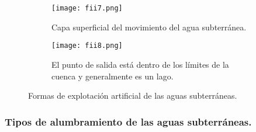 \begin{figure}[h!]
	\centering
	\begin{subfigure}[b]{0.45\linewidth}
		\texttt{[image: fii7.png]}
		\caption{Capa superficial del movimiento del agua subterránea.}
		\label{fii7}
	\end{subfigure}
	\begin{subfigure}[b]{0.45\linewidth}
		\texttt{[image: fii8.png]}
		\caption{El punto de salida está dentro de los límites de la cuenca y generalmente es un lago.}
		\label{fii8}
	\end{subfigure}
	\caption{Formas de explotación artificial de las aguas subterráneas.}
	\label{fig7-8}
\end{figure}

\subsubsection{Tipos de alumbramiento de las aguas subterráneas.}

